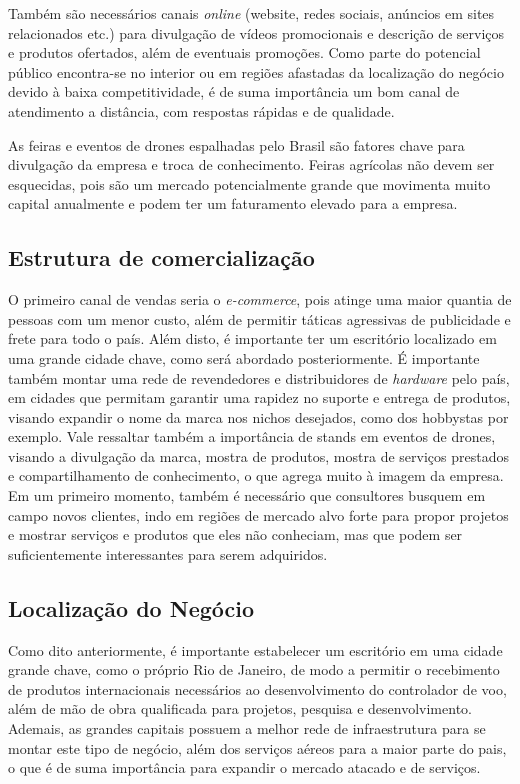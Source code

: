 Também são necessários canais \emph{online} (website, redes sociais, 
anúncios em sites relacionados etc.) para divulgação de vídeos 
promocionais e descrição de serviços e produtos ofertados, além de 
eventuais promoções. Como parte do potencial público encontra-se no 
interior ou em regiões afastadas da localização do negócio devido à baixa 
competitividade, é de suma importância um bom canal de atendimento a 
distância, com respostas rápidas e de qualidade. 

As feiras e eventos de drones espalhadas pelo Brasil são fatores chave para 
divulgação da empresa e troca de conhecimento. Feiras agrícolas não devem 
ser esquecidas, pois são um mercado potencialmente grande que movimenta 
muito capital anualmente e podem ter um faturamento elevado para a empresa. 

\subsection{Estrutura de comercialização}


O primeiro canal de vendas seria o \emph{e-commerce}, pois atinge uma maior 
quantia de pessoas com um menor custo, além de permitir táticas agressivas 
de publicidade e frete para todo o país. Além disto, é importante ter um 
escritório localizado em uma grande cidade chave, como será abordado 
posteriormente. É importante também montar uma rede de revendedores e 
distribuidores de \emph{hardware} pelo país, em cidades que permitam 
garantir uma rapidez no suporte e entrega de produtos, visando expandir o 
nome da marca nos nichos desejados, como dos hobbystas por exemplo. 
Vale ressaltar também a importância de stands em eventos de drones, visando 
a divulgação da marca, mostra de produtos, mostra de serviços prestados e 
compartilhamento de conhecimento, o que agrega muito à imagem da empresa.
Em um primeiro momento, também é necessário que consultores busquem em campo 
novos clientes, indo em regiões de mercado alvo forte para propor projetos e 
mostrar serviços e produtos que eles não conheciam, mas que podem ser 
suficientemente interessantes para serem adquiridos.

\subsection{Localização do Negócio}


Como dito anteriormente, é importante estabelecer um escritório em uma cidade 
grande chave, como o próprio Rio de Janeiro, de modo a permitir o recebimento de 
produtos internacionais necessários ao desenvolvimento do controlador de voo, 
além de mão de obra qualificada para projetos, pesquisa e desenvolvimento. 
Ademais, as grandes capitais possuem a melhor rede de infraestrutura para se 
montar este tipo de negócio, além dos serviços aéreos para a maior parte do 
pais, o que é de suma importância para expandir o mercado atacado e de serviços.
